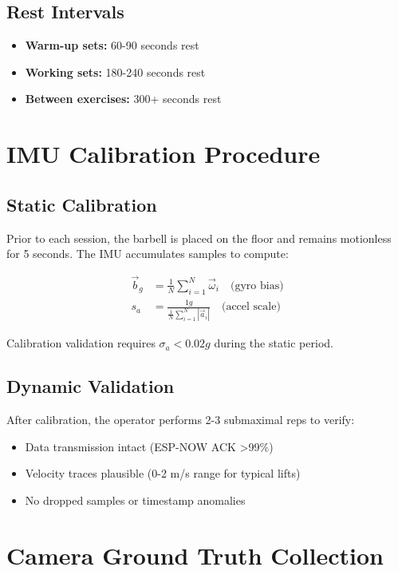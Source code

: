 \subsection{Rest Intervals}

\begin{itemize}
    \item \textbf{Warm-up sets:} 60-90 seconds rest
    \item \textbf{Working sets:} 180-240 seconds rest
    \item \textbf{Between exercises:} 300+ seconds rest
\end{itemize}

\section{IMU Calibration Procedure}

\subsection{Static Calibration}

Prior to each session, the barbell is placed on the floor and remains motionless for 5 seconds. The IMU accumulates samples to compute:

\begin{align}
    \vec{b}_g &= \frac{1}{N}\sum_{i=1}^{N}\vec{\omega}_i \quad \text{(gyro bias)} \\
    s_a &= \frac{1g}{\frac{1}{N}\sum_{i=1}^{N}|\vec{a}_i|} \quad \text{(accel scale)}
\end{align}

Calibration validation requires $\sigma_a < 0.02g$ during the static period.

\subsection{Dynamic Validation}

After calibration, the operator performs 2-3 submaximal reps to verify:
\begin{itemize}
    \item Data transmission intact (ESP-NOW ACK >99\%)
    \item Velocity traces plausible (0-2 m/s range for typical lifts)
    \item No dropped samples or timestamp anomalies
\end{itemize}

\section{Camera Ground Truth Collection}

